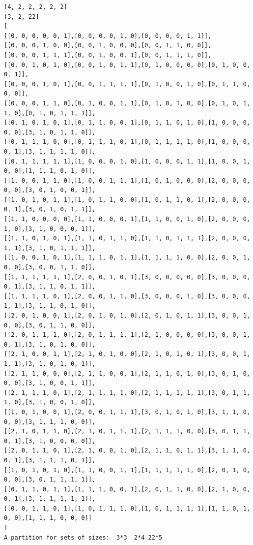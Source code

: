 \documentclass[final]{dmtcs-episciences}
\begin{document}
\begin{appendices}
\begin{verbatim} 
[4, 2, 2, 2, 2, 2]
[3, 2, 22]
[
[[0, 0, 0, 0, 0, 1],[0, 0, 0, 0, 1, 0],[0, 0, 0, 0, 1, 1]],
[[0, 0, 0, 1, 0, 0],[0, 0, 1, 0, 0, 0],[0, 0, 1, 1, 0, 0]],
[[0, 0, 0, 1, 1, 1],[0, 0, 1, 0, 0, 1],[0, 0, 1, 1, 1, 0]],
[[0, 0, 1, 0, 1, 0],[0, 0, 1, 0, 1, 1],[0, 1, 0, 0, 0, 0],[0, 1, 0, 0, 0, 1]],
[[0, 0, 0, 1, 0, 1],[0, 0, 1, 1, 1, 1],[0, 1, 0, 0, 1, 0],[0, 1, 1, 0, 0, 0]],
[[0, 0, 0, 1, 1, 0],[0, 1, 0, 0, 1, 1],[0, 1, 0, 1, 0, 0],[0, 1, 0, 1, 1, 0],[0, 1, 0, 1, 1, 1]],
[[0, 1, 0, 1, 0, 1],[0, 1, 1, 0, 0, 1],[0, 1, 1, 0, 1, 0],[1, 0, 0, 0, 0, 0],[3, 1, 0, 1, 1, 0]],
[[0, 1, 1, 1, 0, 0],[0, 1, 1, 1, 0, 1],[0, 1, 1, 1, 1, 0],[1, 0, 0, 0, 0, 1],[3, 1, 1, 1, 1, 0]],
[[0, 1, 1, 1, 1, 1],[1, 0, 0, 0, 1, 0],[1, 0, 0, 0, 1, 1],[1, 0, 0, 1, 0, 0],[1, 1, 1, 0, 1, 0]],
[[1, 0, 0, 1, 1, 0],[1, 0, 0, 1, 1, 1],[1, 0, 1, 0, 0, 0],[2, 0, 0, 0, 0, 0],[3, 0, 1, 0, 0, 1]],
[[1, 0, 1, 0, 1, 1],[1, 0, 1, 1, 0, 0],[1, 0, 1, 1, 0, 1],[2, 0, 0, 0, 0, 1],[3, 0, 1, 0, 1, 1]],
[[1, 1, 0, 0, 0, 0],[1, 1, 0, 0, 0, 1],[1, 1, 0, 0, 1, 0],[2, 0, 0, 0, 1, 0],[3, 1, 0, 0, 0, 1]],
[[1, 1, 0, 1, 0, 1],[1, 1, 0, 1, 1, 0],[1, 1, 0, 1, 1, 1],[2, 0, 0, 0, 1, 1],[3, 1, 0, 1, 1, 1]],
[[1, 0, 0, 1, 0, 1],[1, 1, 1, 0, 1, 1],[1, 1, 1, 1, 0, 0],[2, 0, 0, 1, 0, 0],[3, 0, 0, 1, 1, 0]],
[[1, 1, 1, 1, 1, 1],[2, 0, 0, 1, 0, 1],[3, 0, 0, 0, 0, 0],[3, 0, 0, 0, 0, 1],[3, 1, 1, 0, 1, 1]],
[[1, 1, 1, 1, 0, 1],[2, 0, 0, 1, 1, 0],[3, 0, 0, 0, 1, 0],[3, 0, 0, 0, 1, 1],[3, 1, 1, 0, 1, 0]],
[[2, 0, 1, 0, 0, 1],[2, 0, 1, 0, 1, 0],[2, 0, 1, 0, 1, 1],[3, 0, 0, 1, 0, 0],[3, 0, 1, 1, 0, 0]],
[[2, 0, 1, 1, 1, 0],[2, 0, 1, 1, 1, 1],[2, 1, 0, 0, 0, 0],[3, 0, 0, 1, 0, 1],[3, 1, 0, 1, 0, 0]],
[[2, 1, 0, 0, 1, 1],[2, 1, 0, 1, 0, 0],[2, 1, 0, 1, 0, 1],[3, 0, 0, 1, 1, 1],[3, 1, 0, 1, 0, 1]],
[[2, 1, 1, 0, 0, 0],[2, 1, 1, 0, 0, 1],[2, 1, 1, 0, 1, 0],[3, 0, 1, 0, 0, 0],[3, 1, 0, 0, 1, 1]],
[[2, 1, 1, 1, 0, 1],[2, 1, 1, 1, 1, 0],[2, 1, 1, 1, 1, 1],[3, 0, 1, 1, 1, 0],[3, 1, 0, 0, 1, 0]],
[[1, 0, 1, 0, 0, 1],[2, 0, 0, 1, 1, 1],[3, 0, 1, 0, 1, 0],[3, 1, 1, 0, 0, 0],[3, 1, 1, 1, 0, 0]],
[[2, 1, 0, 1, 1, 0],[2, 1, 0, 1, 1, 1],[2, 1, 1, 1, 0, 0],[3, 0, 1, 1, 0, 1],[3, 1, 0, 0, 0, 0]],
[[2, 0, 1, 1, 0, 1],[2, 1, 0, 0, 1, 0],[2, 1, 1, 0, 1, 1],[3, 1, 1, 0, 0, 1],[3, 1, 1, 1, 0, 1]],
[[1, 0, 1, 0, 1, 0],[1, 1, 0, 0, 1, 1],[1, 1, 1, 1, 1, 0],[2, 0, 1, 0, 0, 0],[3, 0, 1, 1, 1, 1]],
[[0, 1, 1, 0, 1, 1],[1, 1, 1, 0, 0, 1],[2, 0, 1, 1, 0, 0],[2, 1, 0, 0, 0, 1],[3, 1, 1, 1, 1, 1]],
[[0, 0, 1, 1, 0, 1],[1, 0, 1, 1, 1, 0],[1, 0, 1, 1, 1, 1],[1, 1, 0, 1, 0, 0],[1, 1, 1, 0, 0, 0]]
]
A partition for sets of sizes:  3*3  2*4 22*5


\end{verbatim}
\end{appendices}
\end{document}
